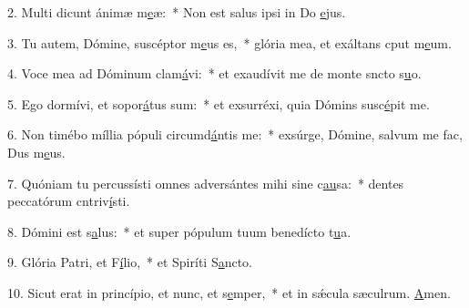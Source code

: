2. Multi dicunt ánimæ m\uline{e}æ:~* Non est salus ipsi in Do \uline{e}jus.\par 
3. Tu autem, Dómine, suscéptor m\uline{e}us es,~* glória mea, et exáltans cput m\uline{e}um.\par 
4. Voce mea ad Dóminum clam\uline{á}vi:~* et exaudívit me de monte sncto s\uline{u}o.\par 
5. Ego dormívi, et sopor\uline{á}tus sum:~* et exsurréxi, quia Dómins susc\uline{é}pit me.\par 
6. Non timébo míllia pópuli circumd\uline{á}ntis me:~* exsúrge, Dómine, salvum me fac, Dus m\uline{e}us.\par 
7. Quóniam tu percussísti omnes adversántes mihi sine c\uline{au}sa:~* dentes peccatórum cntriv\uline{í}sti.\par 
8. Dómini est s\uline{a}lus:~* et super pópulum tuum benedícto t\uline{u}a.\par 
9. Glória Patri, et F\uline{í}lio,~* et Spiríti S\uline{a}ncto.\par 
10. Sicut erat in princípio, et nunc, et s\uline{e}mper,~* et in sǽcula sæculrum. \uline{A}men.\par 
